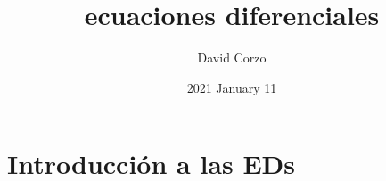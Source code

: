 \documentclass[openany]{book}
\title{ecuaciones diferenciales}
\date{2021 January 11} %
\author{David Corzo}
\begin{document}
\maketitle
\tableofcontents

\chapter{Introducción a las EDs}




\end{document}
